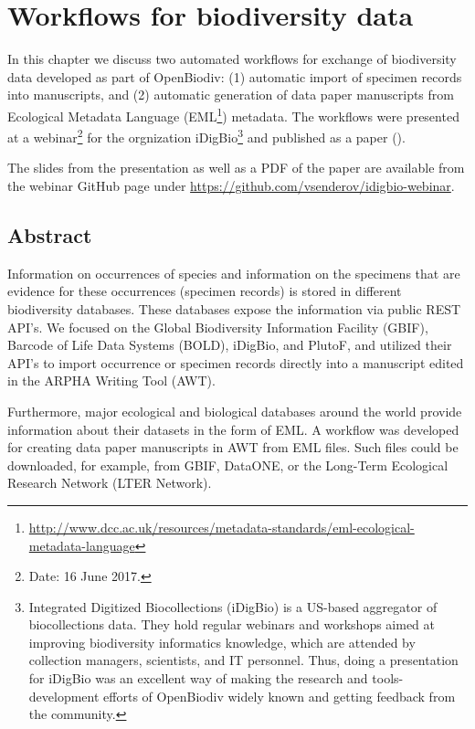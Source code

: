 \chapter{Workflows for biodiversity data}
\label{chapter-case-study}

In this chapter we discuss two automated workflows for exchange of biodiversity data developed as part of OpenBiodiv: (1) automatic import of specimen records into manuscripts, and (2) automatic generation of data paper manuscripts from Ecological Metadata Language (EML\footnote{\url{http://www.dcc.ac.uk/resources/metadata-standards/eml-ecological-metadata-language}}) metadata. The workflows were presented at a webinar\footnote{Date: 16 June 2017.} for the orgnization iDigBio\footnote{Integrated Digitized Biocollections (iDigBio) is a US-based aggregator of biocollections data. They hold regular webinars and workshops aimed at improving biodiversity informatics knowledge, which are attended by collection managers, scientists, and IT personnel. Thus, doing a presentation for iDigBio was an excellent way of making the research and tools-development efforts of OpenBiodiv widely known and getting feedback from the community.} and published as a paper (\cite{senderov_online_2016}).

The slides from the presentation as well as a PDF of the paper are available from the webinar GitHub page under \url{https://github.com/vsenderov/idigbio-webinar}.

\section{Abstract}

Information on occurrences of species and information on the specimens that are evidence for these occurrences (specimen records) is stored in different biodiversity databases. These databases expose the information via public REST API's. We focused on the Global Biodiversity Information Facility (GBIF), Barcode of Life Data Systems (BOLD), iDigBio, and PlutoF, and utilized their API's to import occurrence or specimen records directly into a manuscript edited in the ARPHA Writing Tool (AWT).

Furthermore, major ecological and biological databases around the world provide information about their datasets in the form of EML. A workflow was developed for creating data paper manuscripts in AWT from EML files. Such files could be downloaded, for example, from GBIF, DataONE, or the Long-Term Ecological Research Network (LTER Network).

